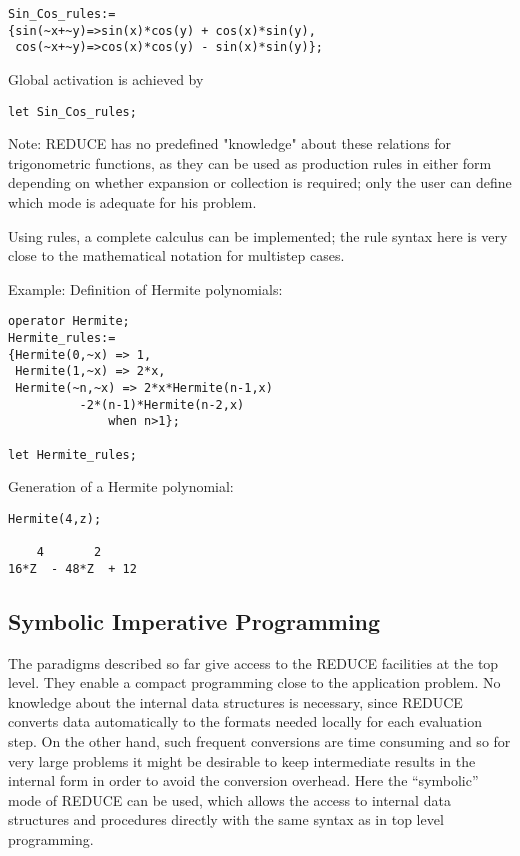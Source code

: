 \begin{verbatim}
Sin_Cos_rules:=
{sin(~x+~y)=>sin(x)*cos(y) + cos(x)*sin(y),
 cos(~x+~y)=>cos(x)*cos(y) - sin(x)*sin(y)};
\end{verbatim}

Global activation is achieved by
\begin{verbatim}
let Sin_Cos_rules;
\end{verbatim}
   
Note: {\small REDUCE} has no predefined "knowledge" about these
relations for trigonometric functions, as they can be used as production
rules in either form depending on whether expansion or collection is
required; only the user can define which mode is adequate for his problem.

Using rules, a complete calculus can be implemented; the rule syntax here
is very close to the mathematical notation for multistep cases.

Example: Definition of Hermite polynomials:
 
\begin{verbatim}
operator Hermite;
Hermite_rules:=
{Hermite(0,~x) => 1,
 Hermite(1,~x) => 2*x,
 Hermite(~n,~x) => 2*x*Hermite(n-1,x)
          -2*(n-1)*Hermite(n-2,x)
              when n>1};

let Hermite_rules;
\end{verbatim}

Generation of a Hermite polynomial:
 
\begin{verbatim}
Hermite(4,z);

    4       2
16*Z  - 48*Z  + 12
\end{verbatim}

\subsection{Symbolic Imperative Programming}

The paradigms described so far give access to the {\small REDUCE}
facilities at the top level.  They enable a compact programming close to
the application problem.  No knowledge about the internal data structures
is necessary, since {\small REDUCE} converts data automatically to the
formats needed locally for each evaluation step.  On the other hand, such
frequent conversions are time consuming and so for very large problems it
might be desirable to keep intermediate results in the internal form in
order to avoid the conversion overhead.  Here the ``symbolic'' mode of
{\small REDUCE} can be used, which allows the access to internal data
structures and procedures directly with the same syntax as in top level
programming.

